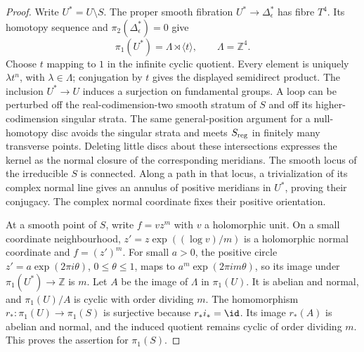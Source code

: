 \begin{proof}
Write $U^*=U\setminus S$. The proper smooth fibration
$U^*\to\Delta_\epsilon^*$ has fibre $T^4$. Its homotopy
sequence and $\pi_2(\Delta_\epsilon^*)=0$ give
\[
 \pi_1(U^*)=\Lambda\rtimes\langle t\rangle,
 \qquad \Lambda=\mathbb Z^4.
\]
Choose $t$ mapping to $1$ in the infinite cyclic quotient.
Every element is uniquely $\lambda t^n$, with $\lambda\in\Lambda$;
conjugation by $t$ gives the displayed semidirect product.
The inclusion $U^*\to U$ induces a surjection on fundamental
groups. A loop can be perturbed off the real-codimension-two
smooth stratum of $S$ and off its higher-codimension singular
strata. The same general-position argument for a null-homotopy
disc avoids the singular strata and meets $S_{\rm reg}$ in
finitely many transverse points. Deleting little discs about
these intersections expresses the kernel as the normal closure
of the corresponding meridians. The smooth locus of the
irreducible $S$ is connected. Along a path in that locus, a
trivialization of its complex normal line gives an annulus of
positive meridians in $U^*$, proving their conjugacy. The complex
normal coordinate fixes their positive orientation.

At a smooth point of $S$, write $f=vz^m$ with $v$ a
holomorphic unit. On a small coordinate neighbourhood,
$z'=z\exp((\log v)/m)$ is a holomorphic normal coordinate
and $f=(z')^m$. For small $a>0$, the positive circle
$z'=a\exp(2\pi i\theta)$, $0\le\theta\le1$, maps to
$a^m\exp(2\pi im\theta)$, so its image under
$\pi_1(U^*)\to\mathbb Z$ is $m$. Let $A$ be the image of $\Lambda$
in $\pi_1(U)$. It is abelian and normal, and
$\pi_1(U)/A$ is cyclic with order dividing $m$.
The homomorphism $r_*:\pi_1(U)\to\pi_1(S)$ is surjective
because $r_*i_*=\id$. Its image $r_*(A)$ is abelian and
normal, and the induced quotient remains cyclic of order
dividing $m$. This proves the assertion for $\pi_1(S)$.

\end{proof}